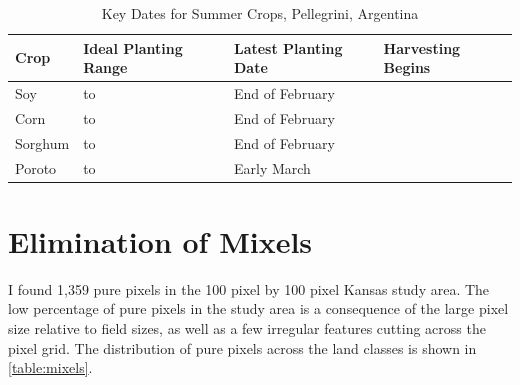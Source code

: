 \begin{table}[b]
\begin{Spacing}{1.0}
  \centering
  \caption{Key Dates for Summer Crops, Pellegrini, Argentina}
  \label{table:plantingdates}
  \begin{tabu}{X[0.45,m,c]X[1,m,c]X[.95,m,c]X[0.5,m,c]}
    \toprule
    \textbf{Crop} & \textbf{Ideal Planting Range} & \textbf{Latest Planting Date} & \textbf{Harvesting Begins} \\
    \midrule
    Soy &  to  & End of February &  \\
    Corn &  to  & End of February &  \\
    Sorghum &  to  & End of February &  \\
    Poroto &  to  & Early March &  \\
    \bottomrule
  \end{tabu}
\end{Spacing}
\end{table}


\section{Elimination of Mixels}

I found 1,359 pure pixels in the 100 pixel by 100 pixel Kansas study area. The low percentage of pure pixels in the study area is a consequence of the large pixel size relative to field sizes, as well as a few irregular features cutting across the pixel grid. The distribution of pure pixels across the land classes is shown in \autoref{table:mixels}.

